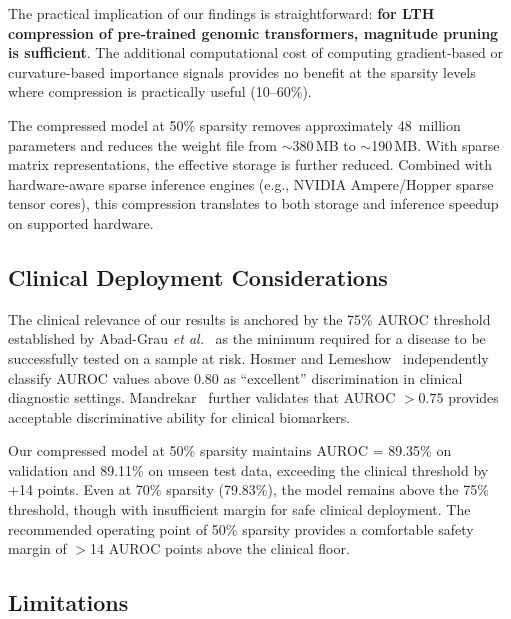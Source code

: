 \documentclass[journal]{IEEEtran}
\begin{document}
The practical implication of our findings is straightforward:
\textbf{for LTH compression of pre-trained genomic
transformers, magnitude pruning is sufficient}.
The additional computational cost of computing gradient-based
or curvature-based importance signals provides no benefit at
the sparsity levels where compression is practically useful
(10--60\%).

The compressed model at 50\% sparsity removes approximately
48~million parameters and reduces the weight file from
$\sim$380\,MB to $\sim$190\,MB.
With sparse matrix representations, the effective storage
is further reduced.
Combined with hardware-aware sparse inference engines
(e.g., NVIDIA Ampere/Hopper sparse tensor cores), this
compression translates to both storage and inference
speedup on supported hardware.

\subsection{Clinical Deployment Considerations}

The clinical relevance of our results is anchored by the
75\% AUROC threshold established by Abad-Grau
\emph{et al.}~\cite{Abad-Grau2016} as the minimum required
for a disease to be successfully tested on a sample at risk.
Hosmer and Lemeshow~\cite{Hosmer2013} independently classify
AUROC values above 0.80 as ``excellent'' discrimination in
clinical diagnostic settings.
Mandrekar~\cite{Mandrekar2010} further validates that AUROC
$> 0.75$ provides acceptable discriminative ability for
clinical biomarkers.

Our compressed model at 50\% sparsity maintains AUROC = 89.35\%
on validation and 89.11\% on unseen test data, exceeding the
clinical threshold by +14 points.
Even at 70\% sparsity (79.83\%), the model remains above the
75\% threshold, though with insufficient margin for safe
clinical deployment.
The recommended operating point of 50\% sparsity provides a
comfortable safety margin of $>$14 AUROC points above the
clinical floor.

\subsection{Limitations}
\end{document}
